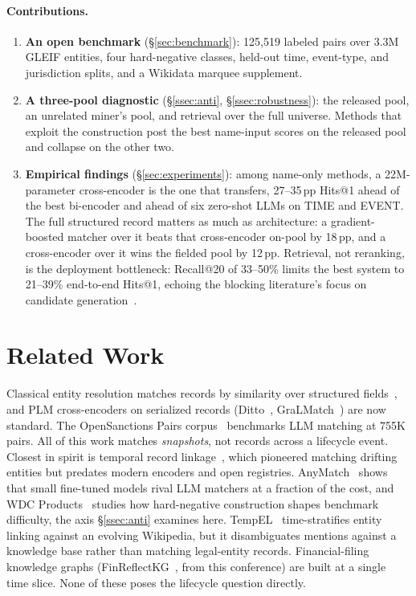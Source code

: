 \documentclass[sigconf]{acmart}
\begin{document}
\paragraph{Contributions.}
\begin{enumerate}
  \item \textbf{An open benchmark} (\S\ref{sec:benchmark}):
        125{,}519 labeled pairs over 3.3M GLEIF entities, four
        hard-negative classes, held-out time, event-type, and
        jurisdiction splits, and a Wikidata marquee supplement.

  \item \textbf{A three-pool diagnostic}
        (\S\ref{ssec:anti}, \S\ref{ssec:robustness}): the released
        pool, an unrelated miner's pool, and retrieval over the full
        universe. Methods that exploit the construction post the best
        name-input scores on the released pool and collapse on the
        other two.

  \item \textbf{Empirical findings} (\S\ref{sec:experiments}):
        among name-only methods, a 22M-parameter cross-encoder is the
        one that transfers, 27--35\,pp Hits@1 ahead of the best
        bi-encoder and ahead of six zero-shot LLMs on TIME and EVENT.
        The full structured record matters as much as architecture:
        a gradient-boosted matcher over it beats that cross-encoder
        on-pool by 18\,pp, and a cross-encoder over it wins the
        fielded pool by 12\,pp. Retrieval, not reranking, is the
        deployment bottleneck: Recall@20 of 33--50\% limits the best
        system to 21--39\% end-to-end Hits@1, echoing the blocking
        literature's focus on candidate
        generation~\cite{uniblocker2024}.
\end{enumerate}

\section{Related Work}
\label{sec:related}

Classical entity resolution matches records by similarity over
structured fields~\cite{fellegisunter1969}, and PLM cross-encoders
on serialized records (Ditto~\cite{ditto2021},
GraLMatch~\cite{gralmatch2025}) are now standard. The OpenSanctions
Pairs corpus~\cite{opensanctions2026} benchmarks LLM matching at
755K pairs. All of this work matches \emph{snapshots}, not records
across a lifecycle event. Closest in spirit is
temporal record linkage~\cite{temporalrl2011}, which pioneered
matching drifting entities but predates modern encoders and open
registries. AnyMatch~\cite{anymatch2024} shows that small
fine-tuned models rival LLM matchers at a fraction of the cost, and
WDC
Products~\cite{wdcproducts2024} studies how hard-negative
construction shapes benchmark difficulty, the axis
\S\ref{ssec:anti} examines here. TempEL~\cite{tempel2022}
time-stratifies entity linking against an evolving Wikipedia, but
it disambiguates mentions against a knowledge base rather than
matching legal-entity records. Financial-filing knowledge graphs
(FinReflectKG~\cite{finreflectkg2025}, from this conference) are
built at a single time slice. None of these poses the lifecycle
question directly.
\end{document}
